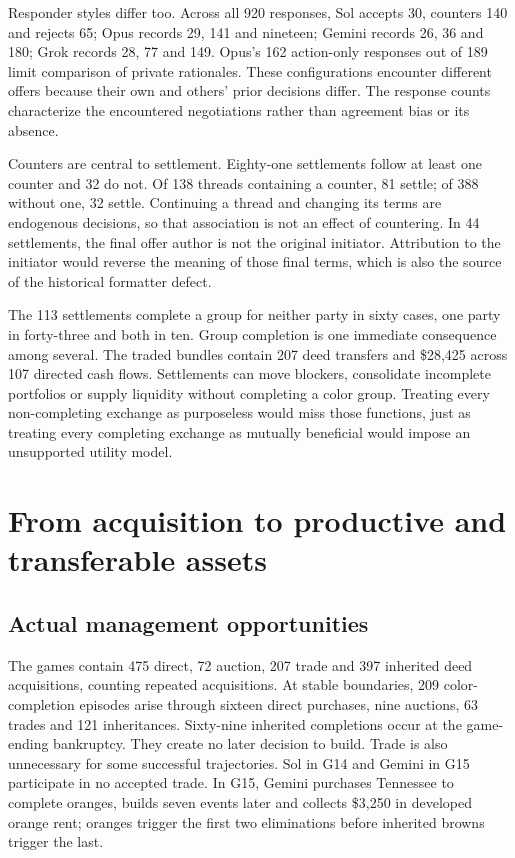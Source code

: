 \documentclass[11pt,letterpaper]{article}
\begin{document}
Responder styles differ too. Across all 920 responses, Sol accepts 30, counters 140 and rejects 65; Opus records 29, 141 and nineteen; Gemini records 26, 36 and 180; Grok records 28, 77 and 149. Opus's 162 action-only responses out of 189 limit comparison of private rationales. These configurations encounter different offers because their own and others' prior decisions differ. The response counts characterize the encountered negotiations rather than agreement bias or its absence.

Counters are central to settlement. Eighty-one settlements follow at least one counter and 32 do not. Of 138 threads containing a counter, 81 settle; of 388 without one, 32 settle. Continuing a thread and changing its terms are endogenous decisions, so that association is not an effect of countering. In 44 settlements, the final offer author is not the original initiator. Attribution to the initiator would reverse the meaning of those final terms, which is also the source of the historical formatter defect.

The 113 settlements complete a group for neither party in sixty cases, one party in forty-three and both in ten. Group completion is one immediate consequence among several. The traded bundles contain 207 deed transfers and \$28,425 across 107 directed cash flows. Settlements can move blockers, consolidate incomplete portfolios or supply liquidity without completing a color group. Treating every non-completing exchange as purposeless would miss those functions, just as treating every completing exchange as mutually beneficial would impose an unsupported utility model.

\section{From acquisition to productive and transferable assets}

\subsection{Actual management opportunities}

The games contain 475 direct, 72 auction, 207 trade and 397 inherited deed acquisitions, counting repeated acquisitions. At stable boundaries, 209 color-completion episodes arise through sixteen direct purchases, nine auctions, 63 trades and 121 inheritances. Sixty-nine inherited completions occur at the game-ending bankruptcy. They create no later decision to build. Trade is also unnecessary for some successful trajectories. Sol in G14 and Gemini in G15 participate in no accepted trade. In G15, Gemini purchases Tennessee to complete oranges, builds seven events later and collects \$3,250 in developed orange rent; oranges trigger the first two eliminations before inherited browns trigger the last.
\end{document}
